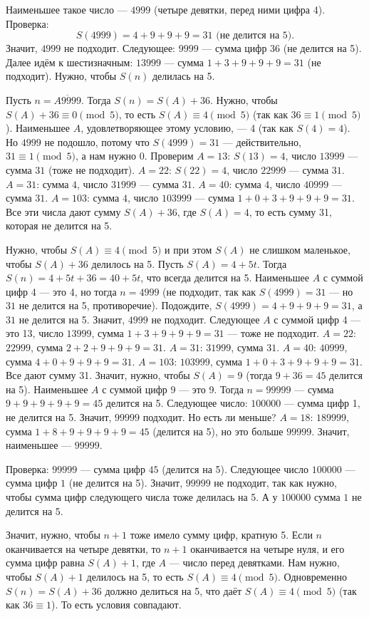 \documentclass[12pt, a4paper]{article}
\begin{document}
Наименьшее такое число — $4999$ (четыре девятки, перед ними цифра 4). Проверка:
\[
S(4999) = 4 + 9 + 9 + 9 = 31 \text{ (не делится на 5)}.
\]
Значит, $4999$ не подходит. Следующее: $9999$ — сумма цифр $36$ (не делится на 5). Далее идём к шестизначным: $13999$ — сумма $1+3+9+9+9 = 31$ (не подходит). Нужно, чтобы $S(n)$ делилась на 5.

Пусть $n = \overline{A9999}$. Тогда $S(n) = S(A) + 36$. Нужно, чтобы $S(A) + 36 \equiv 0 \pmod{5}$, то есть $S(A) \equiv 4 \pmod{5}$ (так как $36 \equiv 1 \pmod{5}$). Наименьшее $A$, удовлетворяющее этому условию, — 4 (так как $S(4)=4$). Но $4999$ не подошло, потому что $S(4999)=31$ — действительно, $31 \equiv 1 \pmod{5}$, а нам нужно $0$. Проверим $A=13$: $S(13)=4$, число $13999$ — сумма $31$ (тоже не подходит). $A=22$: $S(22)=4$, число $22999$ — сумма $31$. $A=31$: сумма $4$, число $31999$ — сумма $31$. $A=40$: сумма $4$, число $40999$ — сумма $31$. $A=103$: сумма $4$, число $103999$ — сумма $1+0+3+9+9+9 = 31$. Все эти числа дают сумму $S(A)+36$, где $S(A)=4$, то есть сумму 31, которая не делится на 5.

Нужно, чтобы $S(A) \equiv 4 \pmod{5}$ и при этом $S(A)$ не слишком маленькое, чтобы $S(A)+36$ делилось на 5. Пусть $S(A) = 4 + 5t$. Тогда $S(n) = 4 + 5t + 36 = 40 + 5t$, что всегда делится на 5. Наименьшее $A$ с суммой цифр 4 — это 4, но тогда $n=4999$ (не подходит, так как $S(4999)=31$ — но $31$ не делится на 5, противоречие). Подождите, $S(4999)=4+9+9+9=31$, а $31$ не делится на 5. Значит, $4999$ не подходит. Следующее $A$ с суммой цифр 4 — это 13, число $13999$, сумма $1+3+9+9+9=31$ — тоже не подходит. $A=22$: $22999$, сумма $2+2+9+9+9=31$. $A=31$: $31999$, сумма $31$. $A=40$: $40999$, сумма $4+0+9+9+9=31$. $A=103$: $103999$, сумма $1+0+3+9+9+9=31$. Все дают сумму 31. Значит, нужно, чтобы $S(A) = 9$ (тогда $9+36=45$ делится на 5). Наименьшее $A$ с суммой цифр 9 — это 9. Тогда $n = 99999$ — сумма $9+9+9+9+9=45$ делится на 5. Следующее число: $100000$ — сумма цифр 1, не делится на 5. Значит, $99999$ подходит. Но есть ли меньше? $A=18$: $189999$, сумма $1+8+9+9+9+9=45$ (делится на 5), но это больше $99999$. Значит, наименьшее — $99999$.

Проверка: $99999$ — сумма цифр $45$ (делится на 5). Следующее число $100000$ — сумма цифр $1$ (не делится на 5). Значит, $99999$ не подходит, так как нужно, чтобы сумма цифр следующего числа тоже делилась на 5. А у $100000$ сумма $1$ не делится на 5.

Значит, нужно, чтобы $n+1$ тоже имело сумму цифр, кратную 5. Если $n$ оканчивается на четыре девятки, то $n+1$ оканчивается на четыре нуля, и его сумма цифр равна $S(A)+1$, где $A$ — число перед девятками. Нам нужно, чтобы $S(A)+1$ делилось на 5, то есть $S(A) \equiv 4 \pmod{5}$. Одновременно $S(n) = S(A)+36$ должно делиться на 5, что даёт $S(A) \equiv 4 \pmod{5}$ (так как $36 \equiv 1$). То есть условия совпадают.
\end{document}
